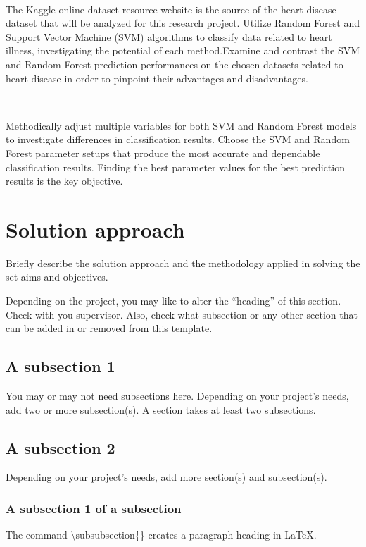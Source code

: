 \


The Kaggle online dataset resource website is the source of the heart disease dataset that will be analyzed for this research project. Utilize Random Forest and Support Vector Machine (SVM) algorithms to classify data related to heart illness, investigating the potential of each method.Examine and contrast the SVM and Random Forest prediction performances on the chosen datasets related to heart disease in order to pinpoint their advantages and disadvantages.

\

Methodically adjust multiple variables for both SVM and Random Forest models to investigate differences in classification results. Choose the SVM and Random Forest parameter setups that produce the most accurate and dependable classification results.
Finding the best parameter values for the best prediction results is the key objective.




\section{Solution approach}
\label{sec:intro_sol} %
Briefly describe the solution approach and the methodology applied in solving the set aims and objectives.

Depending on the project, you may like to alter the ``heading'' of this section. Check with you supervisor. Also, check what subsection or any other section that can be added in or removed from this template.

\subsection{A subsection 1}
\label{sec:intro_some_sub1}
You may or may not need subsections here. Depending on your project's needs, add two or more subsection(s). A section takes at least two subsections. 

\subsection{A subsection 2}
\label{sec:intro_some_sub2}
Depending on your project's needs, add more section(s) and subsection(s).

\subsubsection{A subsection 1 of a subsection}
\label{sec:intro_some_subsub1}
The command \textbackslash subsubsection\{\} creates a paragraph heading in \LaTeX.

